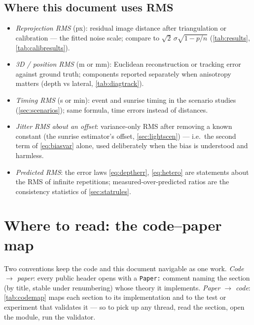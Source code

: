 \documentclass[11pt]{article}
\theoremstyle{definition}
\newcommand{\code}[1]{\texttt{#1}}
\begin{document}
\subsection{Where this document uses RMS}
\begin{itemize}
  \item \emph{Reprojection RMS} (px): residual image distance after
        triangulation or calibration --- the fitted noise scale;
        compare to $\sqrt2\,\sigma\sqrt{1-p/n}$
        (\autoref{tab:results}, \autoref{tab:calibresults}).
  \item \emph{3D / position RMS} (m or mm): Euclidean reconstruction or
        tracking error against ground truth; components reported
        separately when anisotropy matters (depth vs lateral,
        \autoref{tab:diagtrack}).
  \item \emph{Timing RMS} (s or min): event and sunrise timing in the
        scenario studies (\autoref{sec:scenarios}); same formula, time
        errors instead of distances.
  \item \emph{Jitter RMS about an offset}: variance-only RMS after
        removing a known constant (the sunrise estimator's offset,
        \autoref{sec:lightscen}) --- i.e.\ the second term of
        \eqref{eq:biasvar} alone, used deliberately when the bias is
        understood and harmless.
  \item \emph{Predicted RMS}: the error laws \eqref{eq:deptherr},
        \eqref{eq:hetero} are statements about the RMS of infinite
        repetitions; measured-over-predicted ratios are the consistency
        statistics of \autoref{sec:statrules}.
\end{itemize}

\section{Where to read: the code--paper map}
\label{sec:codemap}

Two conventions keep the code and this document navigable as one work.
\emph{Code $\to$ paper}: every public header opens with a
\code{Paper:} comment naming the section (by title, stable under
renumbering) whose theory it implements. \emph{Paper $\to$ code}:
\autoref{tab:codemap} maps each section to its implementation and to
the test or experiment that validates it --- so to pick up any thread,
read the section, open the module, run the validator.
\end{document}
